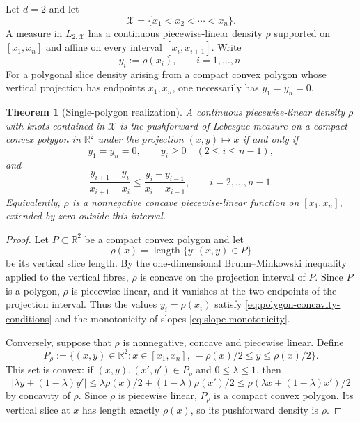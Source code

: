 \documentclass[reqno]{amsart}
\newtheorem{theorem}{Theorem}
\numberwithin{theorem}{section}
\newcommand{\RR}{\mathbb{R}}
\newcommand{\cX}{\mathcal{X}}
\begin{document}
Let $d=2$ and let
\[
\cX=\{x_1<x_2<\cdots <x_n\}.
\]
A measure in $L_{2,\cX}$ has a continuous piecewise-linear density $\rho$ supported on $[x_1,x_n]$ and affine on every interval $[x_i,x_{i+1}]$.  Write
\[
 y_i:=\rho(x_i),\qquad i=1,\dots,n.
\]
For a polygonal slice density arising from a compact convex polygon whose vertical projection has endpoints $x_1,x_n$, one necessarily has $y_1=y_n=0$.

\begin{theorem}[Single-polygon realization]\label{th:single-polygon-realization}
A continuous piecewise-linear density $\rho$ with knots contained in $\cX$ is the pushforward of Lebesgue measure on a compact convex polygon in $\RR^2$ under the projection $(x,y)\mapsto x$ if and only if
\begin{equation}\label{eq:polygon-concavity-conditions}
 y_1=y_n=0,\qquad y_i\ge 0\quad (2\le i\le n-1),
\end{equation}
and
\begin{equation}\label{eq:slope-monotonicity}
\frac{y_{i+1}-y_i}{x_{i+1}-x_i}
\le
\frac{y_i-y_{i-1}}{x_i-x_{i-1}},
\qquad i=2,\dots,n-1.
\end{equation}
Equivalently, $\rho$ is a nonnegative concave piecewise-linear function on $[x_1,x_n]$, extended by zero outside this interval.
\end{theorem}

\begin{proof}
Let $P\subset\RR^2$ be a compact convex polygon and let
\[
\rho(x)=\operatorname{length}\{y:(x,y)\in P\}
\]
be its vertical slice length.  By the one-dimensional Brunn--Minkowski inequality applied to the vertical fibres, $\rho$ is concave on the projection interval of $P$.  Since $P$ is a polygon, $\rho$ is piecewise linear, and it vanishes at the two endpoints of the projection interval.  Thus the values $y_i=\rho(x_i)$ satisfy \eqref{eq:polygon-concavity-conditions} and the monotonicity of slopes \eqref{eq:slope-monotonicity}.

Conversely, suppose that $\rho$ is nonnegative, concave and piecewise linear.  Define
\[
P_\rho:=\{(x,y)\in\RR^2: x\in[x_1,x_n],\ -\rho(x)/2\le y\le \rho(x)/2\}.
\]
This set is convex: if $(x,y),(x',y')\in P_\rho$ and $0\le\lambda\le1$, then
\[
|\lambda y+(1-\lambda)y'|
\le \lambda\rho(x)/2+(1-\lambda)\rho(x')/2
\le \rho(\lambda x+(1-\lambda)x')/2
\]
by concavity of $\rho$.  Since $\rho$ is piecewise linear, $P_\rho$ is a compact convex polygon.  Its vertical slice at $x$ has length exactly $\rho(x)$, so its pushforward density is $\rho$.
\end{proof}
\end{document}
